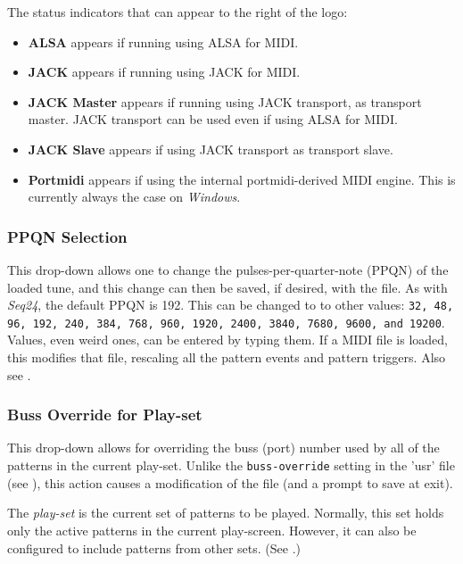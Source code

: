    The status indicators that can appear to the right of the logo:

   \begin{itemize}
      \item \textbf{ALSA} appears if running using ALSA for MIDI.
      \item \textbf{JACK} appears if running using JACK for MIDI.
      \item \textbf{JACK Master} appears if running using JACK transport, as
         transport master.
         JACK transport can be used even if using ALSA for MIDI.
      \item \textbf{JACK Slave} appears if using JACK transport as
         transport slave.
      \item \textbf{Portmidi} appears if using the internal portmidi-derived
         MIDI engine.  This is currently always the case on \textsl{Windows}.
   \end{itemize}

\subsubsection{PPQN Selection}
\label{subsubsec:introduction_ppqn_selection}

   This drop-down allows one to change the pulses-per-quarter-note (PPQN) of the
   loaded tune, and this change can then be saved, if desired, with the file.
   As with \textsl{Seq24}, the default PPQN is 192.  This can be changed to
   to other values:
   \texttt{32, 48, 96, 192, 240, 384, 768, 960, 1920, 2400, 3840,
   7680, 9600, and 19200}.
   Values, even weird ones, can be entered by typing them.
   If a MIDI file is loaded, this modifies that file, rescaling all the
   pattern events and pattern triggers.
   Also see .

\subsubsection{Buss Override for Play-set}
\label{subsubsec:introduction_sets_buss_override}

   This drop-down allows for overriding the buss (port) number used by all of
   the patterns in the current play-set.
   Unlike the \texttt{buss-override} setting in the 'usr' file
   (see ),
   this action causes a modification of the file (and a prompt to save at
   exit).

   The \textsl{play-set} is the current set of patterns to be played.
   Normally, this set holds only the active patterns in the current
   play-screen.
   However, it can also be configured to include patterns from other sets.
   (See .)

